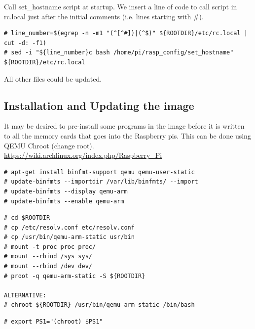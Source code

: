 Call set\_hostname script at startup. We insert a line of code to call script in rc.local just after the initial comments (i.e. lines starting with \#).
\begin{lstlisting}[]
# line_number=$(egrep -n -m1 "(^[^#])|(^$)" ${ROOTDIR}/etc/rc.local | cut -d: -f1)
# sed -i "${line_number}c bash /home/pi/rasp_config/set_hostname" ${ROOTDIR}/etc/rc.local
\end{lstlisting}
\FloatBarrier


All other files could be updated.

\subsection{Installation and Updating the image}

It may be desired to pre-install some programs in the image before it is
written to all the memory cards that goes into the Raspberry pis.
This can be done using QEMU Chroot (change root).
\url{https://wiki.archlinux.org/index.php/Raspberry_Pi}



\begin{lstlisting}[]
# apt-get install binfmt-support qemu qemu-user-static
# update-binfmts --importdir /var/lib/binfmts/ --import
# update-binfmts --display qemu-arm
# update-binfmts --enable qemu-arm
\end{lstlisting}
\FloatBarrier

\begin{lstlisting}[]
# cd $ROOTDIR
# cp /etc/resolv.conf etc/resolv.conf
# cp /usr/bin/qemu-arm-static usr/bin
# mount -t proc proc proc/
# mount --rbind /sys sys/
# mount --rbind /dev dev/
# proot -q qemu-arm-static -S ${ROOTDIR}

ALTERNATIVE:
# chroot ${ROOTDIR} /usr/bin/qemu-arm-static /bin/bash
\end{lstlisting}
\FloatBarrier


\begin{lstlisting}[]
# export PS1="(chroot) $PS1"
\end{lstlisting}
\FloatBarrier



